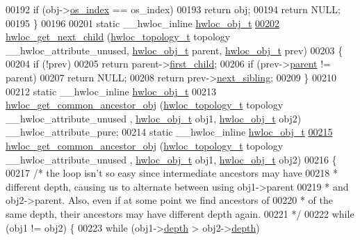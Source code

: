 \begin{DoxyCode}
00192     \textcolor{keywordflow}{if} (obj->\hyperlink{a00016_a61a7a80a68eaccbaaa28269e678c81a9}{os_index} == os\_index)
00193       \textcolor{keywordflow}{return} obj;
00194   \textcolor{keywordflow}{return} NULL;
00195 \}
00196 
00201 \textcolor{keyword}{static} \_\_hwloc\_inline \hyperlink{a00016}{hwloc_obj_t}
\hypertarget{a00031_source_l00202}{}\hyperlink{a00053_gae5ef1af636849f77714e1584ba78cf9c}{00202} \hyperlink{a00053_gae5ef1af636849f77714e1584ba78cf9c}{hwloc_get_next_child} (\hyperlink{a00039_ga9d1e76ee15a7dee158b786c30b6a6e38}{hwloc_topology_t} topology \_\_hwloc\_attribute\_unused, 
      \hyperlink{a00016}{hwloc_obj_t} parent, \hyperlink{a00016}{hwloc_obj_t} prev)
00203 \{
00204   \textcolor{keywordflow}{if} (!prev)
00205     \textcolor{keywordflow}{return} parent->\hyperlink{a00016_af51d08a0a79dba517c06c5afedc8d2dc}{first_child};
00206   \textcolor{keywordflow}{if} (prev->\hyperlink{a00016_adc494f6aed939992be1c55cca5822900}{parent} != parent)
00207     \textcolor{keywordflow}{return} NULL;
00208   \textcolor{keywordflow}{return} prev->\hyperlink{a00016_a7f2343ed476fe4942e6fffd4cade1b40}{next_sibling};
00209 \}
00210 
00212 \textcolor{keyword}{static} \_\_hwloc\_inline \hyperlink{a00016}{hwloc_obj_t}
00213 \hyperlink{a00053_ga52a334f17c6b5b409d5cc6bb4ab8a2ab}{hwloc_get_common_ancestor_obj} (\hyperlink{a00039_ga9d1e76ee15a7dee158b786c30b6a6e38}{hwloc_topology_t} topology \_\_hwloc\_attribute\_unused
      , \hyperlink{a00016}{hwloc_obj_t} obj1, \hyperlink{a00016}{hwloc_obj_t} obj2) \_\_hwloc\_attribute\_pure;
00214 \textcolor{keyword}{static} \_\_hwloc\_inline \hyperlink{a00016}{hwloc_obj_t}
\hypertarget{a00031_source_l00215}{}\hyperlink{a00053_ga52a334f17c6b5b409d5cc6bb4ab8a2ab}{00215} \hyperlink{a00053_ga52a334f17c6b5b409d5cc6bb4ab8a2ab}{hwloc_get_common_ancestor_obj} (\hyperlink{a00039_ga9d1e76ee15a7dee158b786c30b6a6e38}{hwloc_topology_t} topology \_\_hwloc\_attribute\_unused
      , \hyperlink{a00016}{hwloc_obj_t} obj1, \hyperlink{a00016}{hwloc_obj_t} obj2)
00216 \{
00217   \textcolor{comment}{/* the loop isn't so easy since intermediate ancestors may have}
00218 \textcolor{comment}{   * different depth, causing us to alternate between using obj1->parent}
00219 \textcolor{comment}{   * and obj2->parent. Also, even if at some point we find ancestors of}
00220 \textcolor{comment}{   * of the same depth, their ancestors may have different depth again.}
00221 \textcolor{comment}{   */}
00222   \textcolor{keywordflow}{while} (obj1 != obj2) \{
00223     \textcolor{keywordflow}{while} (obj1->\hyperlink{a00016_a9d82690370275d42d652eccdea5d3ee5}{depth} > obj2->\hyperlink{a00016_a9d82690370275d42d652eccdea5d3ee5}{depth})

\end{DoxyCode}
